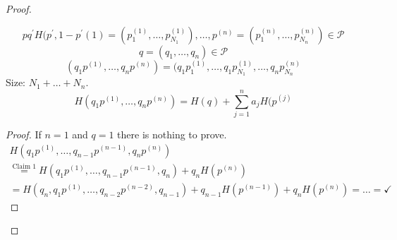 \documentclass[mfit.tex]{subfiles}
\begin{document}
\begin{proof}
  \begin{claim}
    \[ pq^\prime H(p^\prime, 1- p^\prime{(1)} = (p_1^{(1)},\dots,p_{N_1}^{(1)}),\dots,p^{(n)} = (p_1^{(n)},\dots,p_{N_n}^{(n)}) \in \mathcal{P}\]
    \[ q = (q_1,\dots,q_n) \in \mathcal{P}\]
    \[ (q_1 p^{(1)},\dots,q_n p^{(n)}) = (q_1 p_1^{(1)},\dots,q_1p_{N_1}^{(1)},\dots, q_n p_{N_n}^{(n)} \]
    Size: $N_1+\dots+N_n$.
    \[ H(q_1 p^{(1)},\dots,q_np^{(n)}) = H(q) + \sum_{j=1}^n a_j H(p^{(j)} \]
  \end{claim}
  
  \begin{proof}
    If $n = 1$ and $q = 1$ there is nothing to prove.
    \begin{align*}
      H(q_1 p^{(1)},\dots,q_{n-1} p^{(n-1)}, q_n p^{(n)}) \\
      \overset{\text{Claim }1}{=} H(q_1 p^{(1)},\dots,q_{n-1}p^{(n-1)}, q_n) + q_n H(p^{(n)}) \\
      = H(q_n, q_1 p^{(1)},\dots,q_{n-2} p^{(n-2)}, q_{n-1}) 
      + q_{n-1} H(p^{(n-1)}) + q_n H(p^{(n)}) = \dots = \checkmark
    \end{align*}
  \end{proof}
\end{proof}
\end{document}
